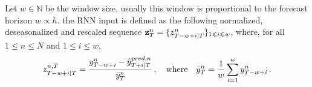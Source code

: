 \documentclass{article} %
\newcommand{\ts}{y}
\newcommand{\tspred}{\hat{\ts}}
\newcommand{\stat}{f}
\newcommand{\statparam}{\theta_{predictor}}
\newcommand{\lag}{h}
\newcommand{\window}{w}
\newcommand{\meants}{\Bar{\ts}}
\newcommand{\rnnwindow}{{\bf \rnninput}}
\newcommand{\rnninput}{z}
\newcommand{\predictor}{\mathrm{RNN}_p}
\newcommand{\classifier}{\mathrm{RNN}_c}
\newcommand{\remainder}{r}
\newcommand{\hiddenregime}{U}
\begin{document}



Let $\window \in \mathbb{N}$ be the window size, usually this window is proportional to the forecast horizon $\window \propto \lag$. the RNN input is defined as the following  normalized, deseasonalized and rescaled sequence $\rnnwindow^n_T = \{\rnninput^{n}_{T-\window+i|T}\}_{1\leqslant i \leqslant w}$, where, for all $1\leqslant n \leqslant N$ and $1\leqslant i \leqslant w$, 
$$
\rnninput^{n,T}_{T-w+i|T} = \frac{\ts^n_{T-w+i} -\tspred^{pred,n}_{T+i|T}}{\meants^n_T}\,,\quad\mbox{where}\quad \meants^n_T = \frac{1}{w}\sum_{i = 1}^{w}\ts^n_{T-w+i}\,.
$$
\end{document}
